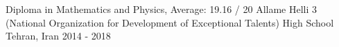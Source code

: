 \begin{cventries}
  \cventry
    {Diploma in Mathematics and Physics, Average: 19.16 / 20} %
    {{\fontsize{9.8pt}{1em}\bodyfont Allame Helli 3 (National Organization for Development of Exceptional Talents) High School}}
    {Tehran, Iran} %
    {2014 - 2018} %
    {} \vspace*{-5mm}

\end{cventries}
